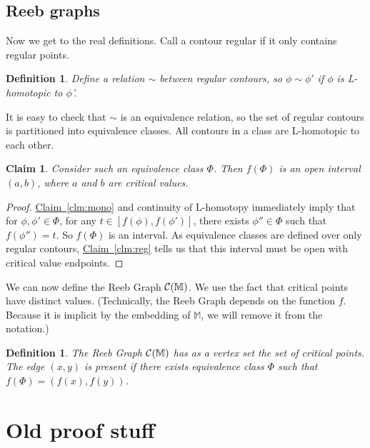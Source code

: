 \documentclass[11pt]{article}
\newtheorem{claim}[theorem]{Claim}
\newtheorem{definition}[theorem]{Definition}
\theoremstyle{definition}
\newcommand{\cC}{{\cal C}}
\newcommand{\MM}{\mathbb{M}}
\newcommand{\Clm}[1]{\hyperref[clm:#1]{Claim~\ref*{clm:#1}}} %
\newcommand{\reeb}{\cC}
\begin{document}
{\subsection{Reeb graphs} \label{sec:reeb}

Now we get to the real definitions. Call a contour regular if it only contains regular points.

\begin{definition} \label{def:rel} Define a relation $\sim$ between regular contours, so $\phi \sim \phi'$ if $\phi$
is L-homotopic to $\phi$'.
\end{definition}

It is easy to check that $\sim$ is an equivalence relation, so the set of regular contours
is partitioned into equivalence classes. All contours in a class are L-homotopic to each other.

\begin{claim} \label{clm:equiv} Consider such an equivalence class $\Phi$. Then $f(\Phi)$
is an open interval $(a,b)$, where $a$ and $b$ are critical values.
\end{claim}

\begin{proof} \Clm{mono} and continuity of L-homotopy immediately imply that for $\phi, \phi' \in \Phi$,
for any $t \in [f(\phi),f(\phi')]$, there exists $\phi'' \in \Phi$ such that $f(\phi'') = t$.
So $f(\Phi)$ is an interval. As equivalence classes are defined over only regular contours, \Clm{reg} 
tells us that this interval must be open with critical value endpoints.
\end{proof}

We can now define the Reeb Graph $\reeb(\MM)$. We use the fact that critical points 
have distinct values. (Technically, the Reeb Graph depends on the function $f$.
Because it is implicit by the embedding of $\MM$, we will remove it from the notation.)

\begin{definition} \label{def:reeb} The \emph{Reeb Graph} $\reeb(\MM)$ has as a vertex set
the set of critical points. The edge $(x,y)$ is present if there exists equivalence class
$\Phi$ such that $f(\Phi) = (f(x),f(y))$.
\end{definition}





\section{Old proof stuff}

}
\end{document}
